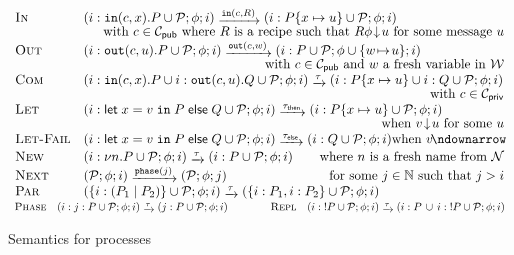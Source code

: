 \begin{figure*}[t]
\centering
$
\begin{array}{ll}
\textsc{In} & (\phase{i} \In(c,x).P \cup \p; \phi;i)\; \lrstep{\In(c,R)} \; (\phase i P \{x \mapsto u\}
              \cup \p; \phi; i)\\[-0.5mm]&
\hfill
\mbox{
with $c\in\Ch_\pub$ where  $R$ is a recipe  such that $R\phi\redc u$ for
some message $u$}\\%
\textsc{Out}& (\phase i \Out(c,u).P \cup \p; \phi; i) \; \lrstep{\Out(c, w)} \; (\phase i P \cup \p; \phi \cup \{w \refer u\}; i)
\\[-0.5mm]&\hfill
\mbox{
\ \ \ \ with $c\in\Ch_\pub$ and $w$ a fresh variable in $\W$}\\
\textsc{Com}& (\phase i \In(c,x).P \cup \phase i \Out(c,u).Q \cup \p; \phi; i) \; \lrstep{\tau} \; (\phase i P\{x\mapsto u\} \cup \phase i Q \cup \p; \phi; i)
\\[-0.5mm]&\hfill
\mbox{
with $c\in\Ch_\priv$}\\
\textsc{Let}&(\phase i \Let \; x = v \; \In \; P \; \Else \; Q\cup \p; \phi; i) \; \lrstep{\tau_\monthen} \;
(\phase i P\{x \mapsto u\} \cup
\p; \phi; i)
\\[-0.5mm]&\hfill
\mbox{
when $v\redc u$ for some $u$}\\%
\textsc{Let-Fail}&(\phase i \Let \; x = v \; \In \; P \; \Else \; Q\cup \p; \phi; i) \; \lrstep{\tau_\monelse} \;
(\phase i Q \cup \p; \phi; i) 
\hfill \mbox{when $v\redcb$}\\[0.5mm]
\textsc{New}& (\phase i \new  {n}.P \cup \p; \phi; i) \;
 \lrstep{\tau} \; (\phase i P\cup \p; \phi; i) \;\;\;\;\;
\hfill \mbox{where $n$ is a fresh name from $\N$}\\%
\textsc{Next}& (\p; \phi; i) \; \lrstep{\mathtt{phase}(j)} \;
 (\p; \phi; j)
\null\hfill
\mbox{for some $j\in\mathbb{N}$ such that $j>i$}\\
\textsc{Par}& (\{\phase i (P_1 \mid P_2)\} \cup \p; \phi; i) \; \lrstep{\tau} \;
 (\{\phase i P_1, \phase i P_2\} \cup \p; \phi; i)\\ %
\end{array}$\\[0.5mm]
$\begin{array}{llcrr}
\textsc{Phase}&
(\phase i \phase j P \cup \p; \phi; i) \; \lrstep{\tau} \;
 (\phase j P \cup \p; \phi; i) &\hspace*{20pt}&
\textsc{Repl}& (\phase i\;!P \cup \p; \phi; i) \; \lrstep{\tau} \;
 (\phase i P \,\cup\, \phase i\;!P \cup \p; \phi; i)
\end{array}
$
\caption{Semantics for processes}
\label{fig:semantics}
\end{figure*}

